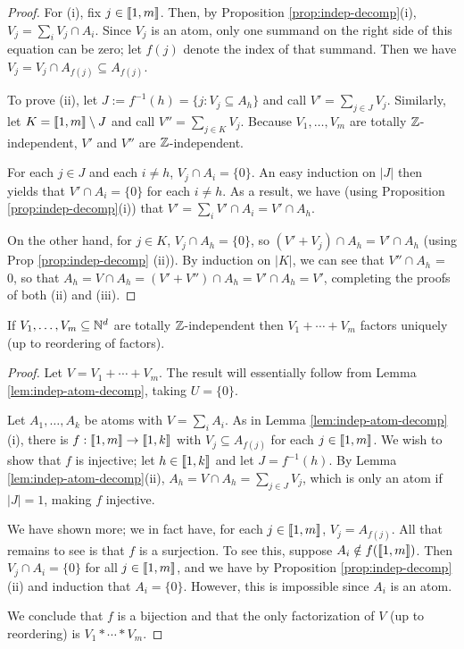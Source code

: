\begin{proof}
For (i), fix $j\in \llbracket 1,m \rrbracket$.
Then, by Proposition \ref{prop:indep-decomp}(i), $V_j = \sum_i V_j \cap A_i$.
Since $V_j$ is an atom, only one summand on the right side of this equation can be zero; let $f(j)$ denote the index of that summand.
Then we have $V_j = V_j \cap A_{f(j)} \subseteq A_{f(j)}$.

To prove (ii), let $J := f^{-1}(h) = \{j: V_j \subseteq A_h\}$ and call $V' = \sum_{j\in J} V_j$.
Similarly, let $K = \llbracket 1,m \rrbracket \setminus J$ and call $V'' = \sum_{j\in K} V_j$.
Because $V_1,\dots, V_m$ are totally $\mathbb{Z}$-independent, $V'$ and $V''$ are $\mathbb{Z}$-independent.

For each $j\in J$ and each $i\neq h$, $V_j\cap A_i = \{0\}$. 
An easy induction on $|J|$ then yields that $V' \cap A_i = \{0\}$ for each $i\neq h$.
As a result, we have (using Proposition \ref{prop:indep-decomp}(i)) that $V' = \sum_i V'\cap A_i = V' \cap A_h$.

On the other hand, for $j\in K$, $V_j\cap A_h = \{0\}$, so $(V' + V_j) \cap A_h = V' \cap A_h$ (using Prop \ref{prop:indep-decomp} (ii)).
By induction on $|K|$, we can see that $V'' \cap A_h$ = 0, so that $A_h = V\cap A_h = (V' + V'')\cap A_h = V' \cap A_h = V'$, completing the proofs of both (ii) and (iii).
\end{proof}

\begin{thm} \label{thm:ind-atoms}
If $V_1,\dots,V_m\subseteq \mathbb{N}^d$ are totally $\mathbb{Z}$-independent then $V_1+\cdots+V_m$ factors uniquely (up to reordering of factors).
\end{thm}

\begin{proof}
Let $V = V_1+\cdots + V_m$.
The result will essentially follow from Lemma \ref{lem:indep-atom-decomp}, taking $U = \{0\}$.

Let $A_1,\dots, A_k$ be atoms with $V = \sum_i A_i$.
As in Lemma \ref{lem:indep-atom-decomp}(i), there is $f:\llbracket 1,m \rrbracket \to \llbracket 1,k\rrbracket$ with $V_j \subseteq A_{f(j)}$ for each $j\in \llbracket 1,m\rrbracket$.
We wish to show that $f$ is injective; let $h\in \llbracket 1,k \rrbracket$ and let $J = f^{-1}(h)$.
By Lemma \ref{lem:indep-atom-decomp}(ii), $A_h = V \cap A_h = \sum_{j\in J} V_j$, which is only an atom if $|J|=1$, making $f$ injective.  

We have shown more; we in fact have, for each $j\in \llbracket 1,m \rrbracket$, $V_j = A_{f(j)}$.
All that remains to see is that $f$ is a surjection.
To see this, suppose $A_i \notin f(\llbracket 1,m \rrbracket)$.
Then $V_j \cap A_i = \{0\}$ for all $j\in  \llbracket 1,m \rrbracket$, and we have by Proposition \ref{prop:indep-decomp}(ii) and induction that $A_i = \{0\}$.
However, this is impossible since $A_i$ is an atom.  

We conclude that $f$ is a bijection and that the only factorization of $V$ (up to reordering) is $V_1*\cdots*V_m$.
\end{proof}

